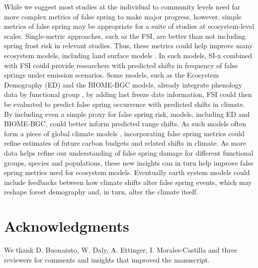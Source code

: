 \documentclass{article}\usepackage[]{graphicx}\usepackage[]{color}
\begin{document}
While we suggest most studies at the individual to community levels need far more complex metrics of false spring to make major progress, however, simple metrics of false spring may be appropriate for a suite of studies at ecosystem-level scales. Single-metric approaches, such as the FSI, are better than not including spring frost risk in relevant studies. Thus, these metrics could help improve many ecosystem models, including land surface models \citep{Foley1998, Moorcroft2001, Prentice1992, Thornton2005}. In such models, SI-x combined with FSI could provide researchers with predicted shifts in frequency of false springs under emission scenarios. Some models, such as the Ecosystem Demography (ED) and the BIOME-BGC models, already integrate phenology data by functional group \citep{Kim2015, Moorcroft2001, Thornton2005}, by adding last freeze date information, FSI could then be evaluated to predict false spring occurrence with predicted shifts in climate. By including even a simple proxy for false spring risk, models, including ED and BIOME-BGC, could better inform predicted range shifts. As such models often form a piece of global climate models \citep{Yu2016}, incorporating false spring metrics could refine estimates of future carbon budgets and related shifts in climate. As more data helps refine our understanding of false spring damage for different functional groups, species and populations, these new insights can in turn help improve false spring metrics used for ecosystem models. Eventually earth system models could include feedbacks between how climate shifts alter false spring events, which may reshape forest demography and, in turn, alter the climate itself.  


\section*{Acknowledgments}
We thank D. Buonaiuto,  W. Daly, A. Ettinger, I. Morales-Castilla and three reviewers for comments and insights that improved the manuscript. 

\nocite{Schwartz1993}
\nocite{Barker2005}
\nocite{Sanchez2013}
\nocite{Longstroth2012}
\nocite{Barlow2015}
\nocite{Longstroth2013}
\nocite{Charrier2011}

\end{document}

